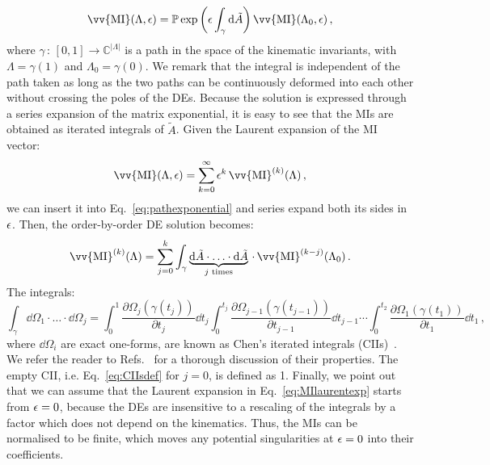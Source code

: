 \documentclass[main.tex]{subfiles}
\begin{document}
\begin{equation} \label{eq:pathexponential}
    \vv{\text{MI}}(\Lambda, \eps) = \mathbb{P} \exp \left(\eps\int_\gamma \dd \tilde{A} \right) \vv{\text{MI}}(\Lambda_0, \eps )\,,
\end{equation}
where $\gamma\,:\,[0, 1] \rightarrow \mathbb{C}^{|\Lambda|}$ is a path in the space of the kinematic invariants, with $\Lambda = \gamma(1)$ and $\Lambda_0 = \gamma(0)$. We remark that the integral is independent of the path taken as long as the two paths can be continuously deformed into each other without crossing the poles of the DEs. Because the solution is expressed through a series expansion of the matrix exponential, it is easy to see that the MIs are obtained as iterated integrals of $\tilde{A}$. Given the Laurent expansion of the MI vector:
\begin{equation} \label{eq:MIlaurentexp}
    \vv{\text{MI}}(\Lambda, \eps) = \sum_{k=0}^\infty \eps^k\,\vv{\text{MI}}^{(k)}(\Lambda) \,,
\end{equation}
we can insert it into Eq.~\ref{eq:pathexponential} and series expand both its sides in $\epsilon$. Then, the order-by-order DE solution becomes:
\begin{equation} \label{eq:DEssolution}
    \vv{\text{MI}}^{(k)}(\Lambda) = \sum_{j=0}^k \int_\gamma \underbrace{\dd \tilde{A} \cdot \ldots \cdot \dd \tilde{A}}_{j\text{ times}} \, \cdot \, \vv{\text{MI}}^{(k-j)}(\Lambda_0)\,.
\end{equation}
The integrals:
\begin{equation} \label{eq:CIIsdef}
    \int_\gamma \dd \Omega_1 \cdot \ldots \cdot \dd \Omega_j = \int_{0}^1 \frac{\partial \Omega_j(\gamma(t_j))}{\partial t_j} \dd t_j \int_{0}^{t_j} \frac{\partial \Omega_{j-1}(\gamma(t_{j-1}))}{\partial t_{j-1}} \dd t_{j-1} \cdots \int_{0}^{t_2} \frac{\partial \Omega_1(\gamma(t_1))}{\partial t_1} \dd t_1 \,,
\end{equation}
where $\dd \Omega_i$ are exact one-forms, are known as Chen's iterated integrals (CIIs)~\cite{Chen:1977oja}. We refer the reader to Refs.~\cite{Brown:2013qva, Abreu:2022mfk} for a thorough discussion of their properties. The empty CII, i.e. Eq.~\ref{eq:CIIsdef} for $j=0$, is defined as 1. Finally, we point out that we can assume that the Laurent expansion in Eq.~\ref{eq:MIlaurentexp} starts from $\epsilon=0$, because the DEs are insensitive to a rescaling of the integrals by a factor which does not depend on the kinematics. Thus, the MIs can be normalised to be finite, which moves any potential singularities at $\epsilon=0$ into their coefficients. 
\end{document}
